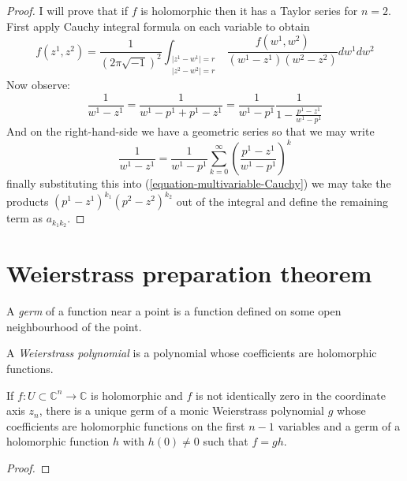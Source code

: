 \begin{proof}
I will prove that if $f$ is holomorphic then it has a Taylor series for $n=2$. 
First apply Cauchy integral formula on each variable to obtain
$$
f(z^1,z^2)=\frac{1}{(2\pi\sqrt{-1})^2}
\int_{\substack{|z^1-w^1|=r \\ |z^2-w^2|=r}}
\frac{f(w^1,w^2)}{(w^1-z^1)(w^2-z^2)}dw^1dw^2
$$
Now observe:
\begin{equation}
\label{equation-multivariable-Cauchy}
\frac{1}{w^1-z^1}=\frac{1}{w^1-p^1+p^1-z^1}
=\frac{1}{w^1-p^1}\frac{1}{1-\frac{p^1-z^1}{w^1-p^1}}
\end{equation}
And on the right-hand-side we have a geometric series so that we may write
$$
\frac{1}{w^1-z^1}
=\frac{1}{w^1-p^1}\sum_{k=0}^\infty\left(\frac{p^1-z^1}{w^1-p^1}\right)^k
$$
finally substituting this into (\ref{equation-multivariable-Cauchy}) we may take
the products $(p^1-z^1)^{k_1}(p^2-z^2)^{k_2}$ out of the integral and define the
remaining term as $a_{k_1k_2}$.
\end{proof}

\section{Weierstrass preparation theorem}
\label{section-Weierstrass-preparation-theorem}

\begin{definition}
\label{definition-germ}
A {\it germ} of a function near a point is a function defined on some open 
neighbourhood of the point.
\end{definition}

\begin{definition}
\label{definition-Weierstrass-polynomial}
A {\it Weierstrass polynomial} is a polynomial whose coefficients are
holomorphic functions.
\end{definition}

\begin{theorem}
\label{theorem-Weierstrass-preparation}
If $f:U\subset\mathbb{C}^n\to\mathbb{C}$ is holomorphic and $f$ is not
identically zero in the coordinate axis $z_n$, there
is a unique germ of a monic Weierstrass polynomial $g$ whose coefficients are
holomorphic functions on the first $n-1$ variables 
and a germ of a holomorphic 
function $h$ with $h(0)\neq 0$ such that $f=gh$.
\end{theorem}

\begin{proof}

\end{proof}

